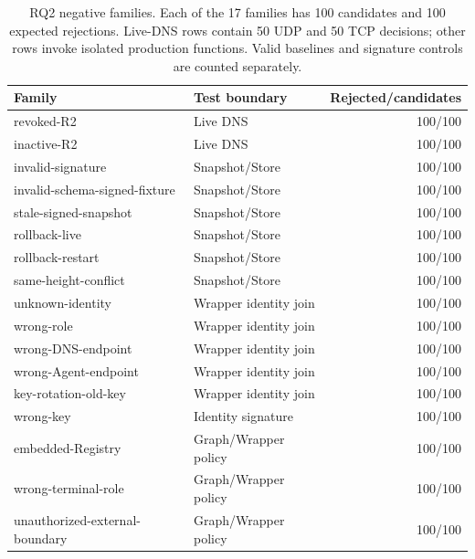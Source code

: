 \begin{table}[t]
\centering\small
\setlength{\tabcolsep}{3.5pt}
\caption{RQ2 negative families. Each of the 17 families has 100 candidates and 100 expected rejections. Live-DNS rows contain 50 UDP and 50 TCP decisions; other rows invoke isolated production functions. Valid baselines and signature controls are counted separately.}
\label{tab:rq2-all}
\begin{tabularx}{\textwidth}{@{}X X r@{}}
\toprule
Family & Test boundary & Rejected/candidates \\
\midrule
revoked-R2 & Live DNS & 100/100 \\
inactive-R2 & Live DNS & 100/100 \\
invalid-signature & Snapshot/Store & 100/100 \\
invalid-schema-signed-fixture & Snapshot/Store & 100/100 \\
stale-signed-snapshot & Snapshot/Store & 100/100 \\
rollback-live & Snapshot/Store & 100/100 \\
rollback-restart & Snapshot/Store & 100/100 \\
same-height-conflict & Snapshot/Store & 100/100 \\
unknown-identity & Wrapper identity join & 100/100 \\
wrong-role & Wrapper identity join & 100/100 \\
wrong-DNS-endpoint & Wrapper identity join & 100/100 \\
wrong-Agent-endpoint & Wrapper identity join & 100/100 \\
key-rotation-old-key & Wrapper identity join & 100/100 \\
wrong-key & Identity signature & 100/100 \\
embedded-Registry & Graph/Wrapper policy & 100/100 \\
wrong-terminal-role & Graph/Wrapper policy & 100/100 \\
unauthorized-external-boundary & Graph/Wrapper policy & 100/100 \\
\bottomrule
\end{tabularx}
\end{table}
